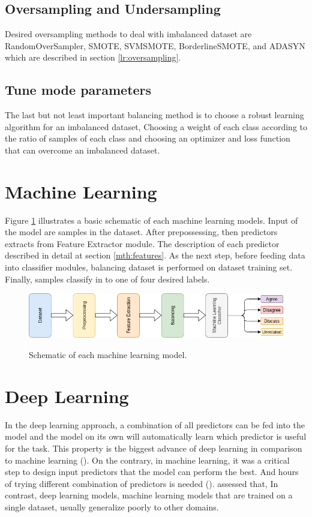 \subsection{Oversampling and Undersampling}
 Desired oversampling methods to deal with imbalanced dataset are RandomOverSampler, SMOTE, SVMSMOTE, BorderlineSMOTE, and ADASYN which are described in section \ref{lr:oversampling}. 

\subsection{Tune mode parameters}
 The last but not least important balancing method is to choose a robust learning algorithm for an imbalanced dataset, Choosing a weight of each class according to the ratio of samples of each class and choosing an optimizer and loss function that can overcome an imbalanced dataset.

\section{Machine Learning}
\label{mth:ml}
Figure \ref{fig:mlschm} illustrates a basic schematic of each machine learning models. Input of the model are samples in the dataset. After prepossessing, then predictors extracts from Feature Extractor module. The description of each predictor described in detail at section \ref{mth:features}. As the next step, before feeding data into classifier modules, balancing dataset is performed on dataset training set. Finally, samples classify in to one of four desired labels. 
\begin{figure}%
	\centering
	{\includegraphics[width=14.5cm]{statistics/schema/ml.png} }
	\caption{Schematic of each machine learning model.}%
	\label{fig:mlschm}%
\end{figure}


\section{Deep Learning}
\label{mth:dl}
In the deep learning approach, a combination of all predictors can be fed into the model and the model on its own will automatically learn which predictor is useful for the task. This property is the biggest advance of deep learning in comparison to machine learning (\cite{book_datafake}). On the contrary, in machine learning, it was a critical step to design input predictors that the model can perform the best. And hours of trying different combination of predictors is needed (\cite{book_fake}). \cite{stance_robust} assessed that, In contrast, deep learning models, machine learning models that are trained on a single dataset, usually generalize poorly to other domains.

